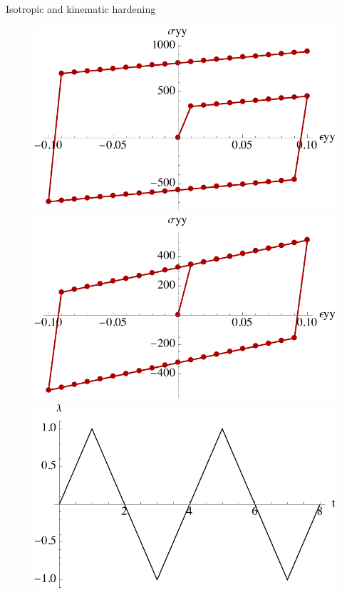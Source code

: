 \documentclass[aspectratio=169,xcolor=dvipsnames]{beamer}
\begin{document}
\begin{frame}{Isotropic and kinematic hardening}
		\begin{figure}
		\begin{minipage}{0.35\linewidth}
			\begin{minipage}[c]{0.5\linewidth}
				\includegraphics[width=\linewidth]{patch_isotropic.pdf}
			\end{minipage}\hfill
			\begin{minipage}[c]{0.5\linewidth}
				\includegraphics[width=\linewidth]{patch_kinematic.pdf}
			\end{minipage}\hfill
		\begin{minipage}{\linewidth}
			\centering
			\includegraphics[width=0.8\linewidth]{load.pdf}

\end{minipage}
\end{minipage}
\end{figure}
\end{frame}
\end{document}
